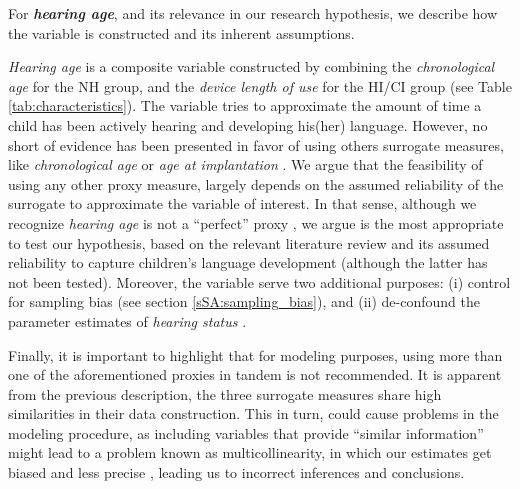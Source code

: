 For \textbf{\textit{hearing age}}, and its relevance in our research hypothesis, we describe how the variable is constructed and its inherent assumptions. 

\textit{Hearing age} is a composite variable constructed by combining the \textit{chronological age} for the NH group, and the \textit{device length of use} for the HI/CI group \citep{Faes_et_al_2021} (see Table \ref{tab:characteristics}). The variable tries to approximate the amount of time a child has been actively hearing and developing his(her) language. However, no short of evidence has been presented in favor of using others surrogate measures, like \textit{chronological age} \cite{Flipsen_et_al_2006, Habib_et_al_2010, Grandon_et_al_2020} or \textit{age at implantation} \cite{Niparko_et_al_2010, Boons_et_al_2012, Bruijnzeel_et_al_2016, Dettman_et_al_2016}. We argue that the feasibility of using any other proxy measure, largely depends on the assumed reliability of the surrogate to approximate the variable of interest. In that sense, although we recognize \textit{hearing age} is not a ``perfect'' proxy \cite{Faes_et_al_2021}, we argue is the most appropriate to test our hypothesis, based on the relevant literature review and its assumed reliability to capture children's language development (although the latter has not been tested). Moreover, the variable serve two additional purposes: (i) control for sampling bias (see section \ref{sSA:sampling_bias}), and (ii) de-confound the parameter estimates of \textit{hearing status} \cite{Cinelli_et_al_2021}.

Finally, it is important to highlight that for modeling purposes, using more than one of the aforementioned proxies in tandem is not recommended. It is apparent from the previous description, the three surrogate measures share high similarities in their data construction. This in turn, could cause problems in the modeling procedure, as including variables that provide ``similar information'' might lead to a problem known as multicollinearity, in which our estimates get biased and less precise \cite{Farrar_et_al_1967}, leading us to incorrect inferences and conclusions.
%
\begin{comment}
	for the NH group uses the child's \textit{age} (at recording), the method cannot use the same variable for the other two groups. This is due to the fact that \textit{age} is merely used as a proxy, for the amount of time a child has been developing his(her) language. In that sense, more appropriate variables to use under the HI/CI group would be e.g. the \textit{device length of use}, which approximates the ``hearing age'' of such children, or their \textit{vocabulary size}, which resembles their "lexical age" \citep{Faes_et_al_2021}. For this research, we consider the \textit{device length of use} as the simplest one to implement.
\end{comment}

